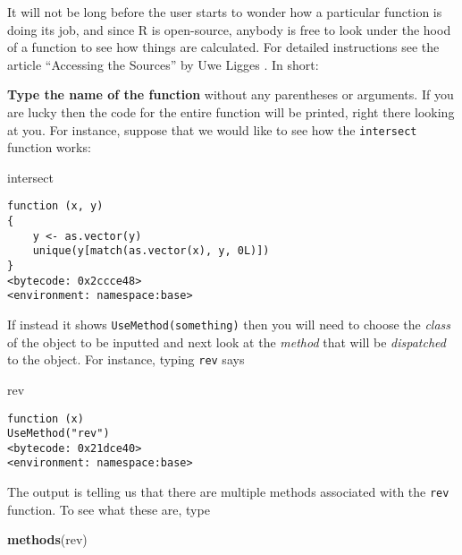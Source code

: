 \documentclass[]{book}
\newenvironment{Shaded}{\begin{snugshade}}{\end{snugshade}}
\newcommand{\KeywordTok}[1]{\textcolor[rgb]{0.13,0.29,0.53}{\textbf{{#1}}}}
\newcommand{\NormalTok}[1]{{#1}}
\numberwithin{equation}{chapter}
\numberwithin{figure}{chapter}
\theoremstyle{plain}
\theoremstyle{definition}
\theoremstyle{remark}
\theoremstyle{definition}
\theoremstyle{definition}
\theoremstyle{remark}
\begin{document}
It will not be long before the user starts to wonder how a particular
function is doing its job, and since R is open-source, anybody is free
to look under the hood of a function to see how things are calculated.
For detailed instructions see the article ``Accessing the Sources'' by
Uwe Ligges \autocite{Ligges2006}. In short:

\textbf{Type the name of the function} without any parentheses or
arguments. If you are lucky then the code for the entire function will
be printed, right there looking at you. For instance, suppose that we
would like to see how the \texttt{intersect}
 function works:

\begin{Shaded}
\begin{Highlighting}[]
\NormalTok{intersect}
\end{Highlighting}
\end{Shaded}

\begin{verbatim}
function (x, y) 
{
    y <- as.vector(y)
    unique(y[match(as.vector(x), y, 0L)])
}
<bytecode: 0x2ccce48>
<environment: namespace:base>
\end{verbatim}

If instead it shows \texttt{UseMethod(something)}
 then you will need to choose the
\emph{class} of the object to be inputted and next look at the
\emph{method} that will be \emph{dispatched} to the object. For
instance, typing \texttt{rev}  says

\begin{Shaded}
\begin{Highlighting}[]
\NormalTok{rev}
\end{Highlighting}
\end{Shaded}

\begin{verbatim}
function (x) 
UseMethod("rev")
<bytecode: 0x21dce40>
<environment: namespace:base>
\end{verbatim}

The output is telling us that there are multiple methods associated with
the \texttt{rev} function. To see what these are, type

\begin{Shaded}
\begin{Highlighting}[]
\KeywordTok{methods}\NormalTok{(rev)}
\end{Highlighting}
\end{Shaded}
\end{document}
